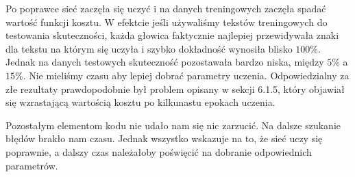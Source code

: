 Po poprawce sieć zaczęła się uczyć i na danych treningowych zaczęła spadać wartość funkcji kosztu. W efektcie jeśli
używaliśmy tekstów treningowych do testowania skuteczności, każda głowica faktycznie najlepiej przewidywała
znaki dla tekstu na którym się uczyła i szybko dokładność wynosiła blisko $100\%$. Jednak na danych testowych
skuteczność pozostawała bardzo niska, między $5\%$ a $15\%$. Nie mieliśmy czasu aby lepiej dobrać parametry uczenia.
Odpowiedzialny za złe rezultaty prawdopodobnie był problem opisany w sekcji 6.1.5, który objawiał 
się wzrastającą wartością kosztu po kilkunastu epokach uczenia.

Pozostałym elementom kodu nie udało nam się nic zarzucić. Na dalsze szukanie błędów brakło nam czasu.
Jednak wszystko wskazuje na to, że sieć uczy się poprawnie, a dalszy czas należałoby poświęcić na dobranie odpowiednich
parametrów.
